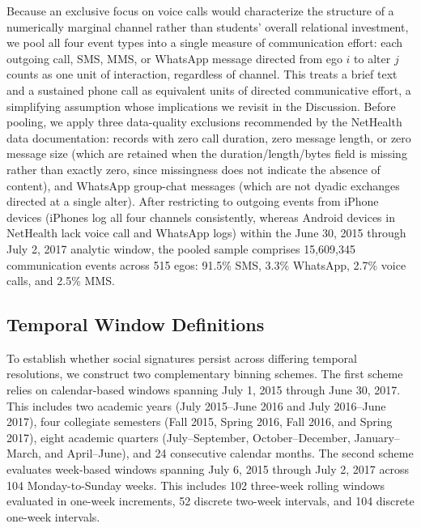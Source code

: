 \documentclass[11pt,letterpaper]{article}
\begin{document}
Because an exclusive focus on voice calls would characterize the structure of a numerically marginal channel rather than students' overall relational investment, we pool all four event types into a single measure of communication effort: each outgoing call, SMS, MMS, or WhatsApp message directed from ego $i$ to alter $j$ counts as one unit of interaction, regardless of channel. This treats a brief text and a sustained phone call as equivalent units of directed communicative effort, a simplifying assumption whose implications we revisit in the Discussion. Before pooling, we apply three data-quality exclusions recommended by the NetHealth data documentation: records with zero call duration, zero message length, or zero message size (which are retained when the duration/length/bytes field is missing rather than exactly zero, since missingness does not indicate the absence of content), and WhatsApp group-chat messages (which are not dyadic exchanges directed at a single alter). After restricting to outgoing events from iPhone devices (iPhones log all four channels consistently, whereas Android devices in NetHealth lack voice call and WhatsApp logs) within the June 30, 2015 through July 2, 2017 analytic window, the pooled sample comprises 15,609,345 communication events across 515 egos: 91.5\% SMS, 3.3\% WhatsApp, 2.7\% voice calls, and 2.5\% MMS.

\subsection{Temporal Window Definitions}
To establish whether social signatures persist across differing temporal resolutions, we construct two complementary binning schemes. The first scheme relies on calendar-based windows spanning July 1, 2015 through June 30, 2017. This includes two academic years (July 2015--June 2016 and July 2016--June 2017), four collegiate semesters (Fall 2015, Spring 2016, Fall 2016, and Spring 2017), eight academic quarters (July--September, October--December, January--March, and April--June), and 24 consecutive calendar months. The second scheme evaluates week-based windows spanning July 6, 2015 through July 2, 2017 across 104 Monday-to-Sunday weeks. This includes 102 three-week rolling windows evaluated in one-week increments, 52 discrete two-week intervals, and 104 discrete one-week intervals.
\end{document}
